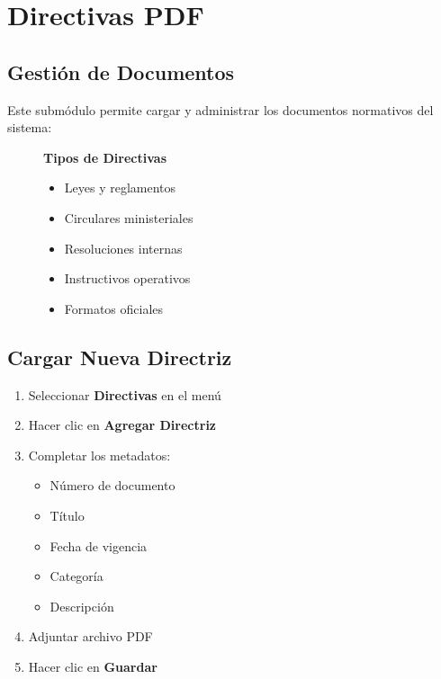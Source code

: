 \section{Directivas PDF}

\subsection*{Gestión de Documentos}

Este submódulo permite cargar y administrar los documentos normativos del sistema:

\begin{figure}[H]
\begin{tcolorbox}[
    enhanced,
    colback=sandraSoft,
    colframe=sandraDark,
    width=0.9\textwidth,
    halign=center
]
\small
\textbf{Tipos de Directivas}\\
\smallskip
\begin{itemize}
    \item Leyes y reglamentos
    \item Circulares ministeriales
    \item Resoluciones internas
    \item Instructivos operativos
    \item Formatos oficiales
\end{itemize}
\end{tcolorbox}
\end{figure}

\subsection*{Cargar Nueva Directriz}

\begin{enumerate}[leftmargin=*]
    \item Seleccionar \textbf{Directivas} en el menú
    \item Hacer clic en \textbf{Agregar Directriz}
    \item Completar los metadatos:
    \begin{itemize}
        \item Número de documento
        \item Título
        \item Fecha de vigencia
        \item Categoría
        \item Descripción
    \end{itemize}
    \item Adjuntar archivo PDF
    \item Hacer clic en \textbf{Guardar}
\end{enumerate}

